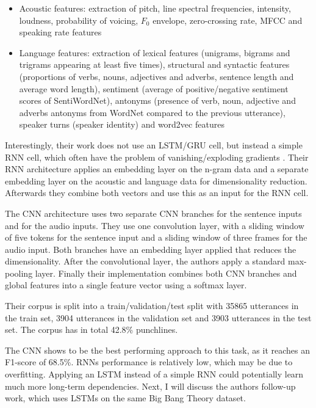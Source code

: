 \documentclass[draft,final,oneside]{vutinfth} %
\begin{document}
\begin{itemize}
\item Acoustic features: extraction of pitch, line spectral frequencies, intensity, loudness, probability of voicing, $F_0$ envelope, zero-crossing rate, MFCC and speaking rate features
\item Language features: extraction of lexical features (unigrams, bigrams and trigrams appearing at least five times), structural and syntactic features (proportions of verbs, nouns, adjectives and adverbs, sentence length and average word length), sentiment (average of positive/negative sentiment scores of SentiWordNet), antonyms (presence of verb, noun, adjective and adverbs antonyms from WordNet compared to the previous utterance), speaker turns (speaker identity) and word2vec features \cite{wordnet}\cite{word2vec}
\end{itemize}

Interestingly, their work does not use an LSTM/GRU cell, but instead a simple RNN cell, which often have the problem of vanishing/exploding gradients \cite{hochreiter}. Their RNN architecture applies an embedding layer on the n-gram data and a separate embedding layer on the acoustic and language data for dimensionality reduction. Afterwards they combine both vectors and use this as an input for the RNN cell.

The CNN architecture uses two separate CNN branches for the sentence inputs and for the audio inputs. They use one convolution layer, with a sliding window of five tokens for the sentence input and a sliding window of three frames for the audio input. Both branches have an embedding layer applied that reduces the dimensionality. After the convolutional layer, the authors apply a standard max-pooling layer. Finally their implementation combines both CNN branches and global features into a single feature vector using a softmax layer.

Their corpus is split into a train/validation/test split with 35865 utterances in the train set, 3904 utterances in the validation set and 3903 utterances in the test set. The corpus has in total 42.8\% punchlines.

The CNN shows to be the best performing approach to this task, as it reaches an F1-score of 68.5\%. RNNs performance is relatively low, which may be due to overfitting. Applying an LSTM instead of a simple RNN could potentially learn much more long-term dependencies. Next, I will discuss the authors follow-up work, which uses LSTMs on the same Big Bang Theory dataset.
\end{document}
